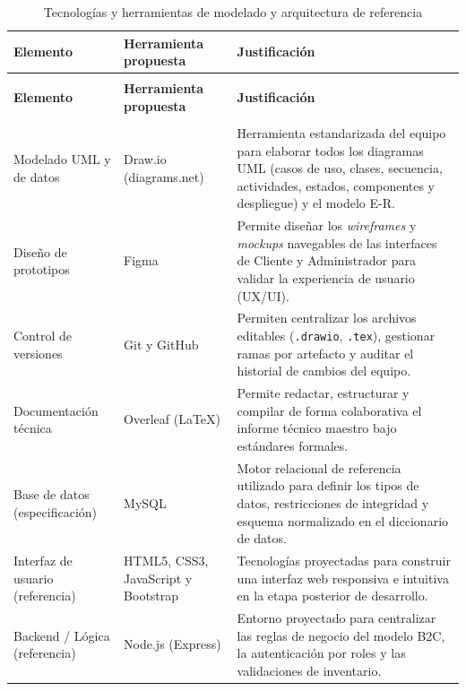 {\small
\begin{xltabular}{\textwidth}{|>{\raggedright\arraybackslash}p{2.8cm}|>{\raggedright\arraybackslash}p{3.4cm}|X|}
    \caption{Tecnologías y herramientas de modelado y arquitectura de referencia}
    \label{tab:tecnologias_herramientas} \\
    \hline
    \textbf{Elemento} & \textbf{Herramienta propuesta} & \textbf{Justificación} \\
    \hline
    \endfirsthead

     \\
    \hline
    \textbf{Elemento} & \textbf{Herramienta propuesta} & \textbf{Justificación} \\
    \hline
    \endhead

     \\
    \endfoot

    \endlastfoot

    Modelado UML y de datos & Draw.io (diagrams.net) & Herramienta estandarizada del equipo para elaborar todos los diagramas UML (casos de uso, clases, secuencia, actividades, estados, componentes y despliegue) y el modelo E-R. \\*
    \hline
    Diseño de prototipos & Figma & Permite diseñar los \textit{wireframes} y \textit{mockups} navegables de las interfaces de Cliente y Administrador para validar la experiencia de usuario (UX/UI). \\*
    \hline
    Control de versiones & Git y GitHub & Permiten centralizar los archivos editables (\texttt{.drawio}, \texttt{.tex}), gestionar ramas por artefacto y auditar el historial de cambios del equipo. \\*
    \hline
    Documentación técnica & Overleaf (LaTeX) & Permite redactar, estructurar y compilar de forma colaborativa el informe técnico maestro bajo estándares formales. \\*
    \hline
    Base de datos (especificación) & MySQL & Motor relacional de referencia utilizado para definir los tipos de datos, restricciones de integridad y esquema normalizado en el diccionario de datos. \\*
    \hline
    Interfaz de usuario (referencia) & HTML5, CSS3, JavaScript y Bootstrap & Tecnologías proyectadas para construir una interfaz web responsiva e intuitiva en la etapa posterior de desarrollo. \\*
    \hline
    Backend / Lógica (referencia) & Node.js (Express) & Entorno proyectado para centralizar las reglas de negocio del modelo B2C, la autenticación por roles y las validaciones de inventario. \\
    \hline
\end{xltabular}
}

